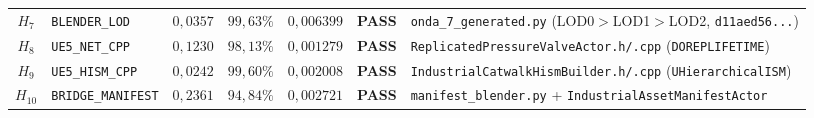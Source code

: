 \documentclass[10pt,a4paper]{article}
\begin{document}
\begin{table}[!htbp]
\begin{tabularx}{\linewidth}{@{}clrrrrY@{}}
$H_7$ & \texttt{BLENDER\_\allowbreak{}LOD} & $0,0357$ & $99,63\%$ & $0,006399$ & \textbf{PASS} & \texttt{onda\_\allowbreak{}7\_\allowbreak{}generated.py} (LOD0$>$LOD1$>$LOD2, \texttt{d11aed56...}) \\
$H_8$ & \texttt{UE5\_\allowbreak{}NET\_\allowbreak{}CPP} & $0,1230$ & $98,13\%$ & $0,001279$ & \textbf{PASS} & \texttt{ReplicatedPressureValveActor.h/.cpp} (\texttt{DOREPLIFETIME}) \\
$H_9$ & \texttt{UE5\_\allowbreak{}HISM\_\allowbreak{}CPP} & $0,0242$ & $99,60\%$ & $0,002008$ & \textbf{PASS} & \texttt{IndustrialCatwalkHismBuilder.h/.cpp} (\texttt{UHierarchicalISM}) \\
$H_{10}$ & \texttt{BRIDGE\_\allowbreak{}MANIFEST} & $0,2361$ & $94,84\%$ & $0,002721$ & \textbf{PASS} & \texttt{manifest\_\allowbreak{}blender.py} + \texttt{IndustrialAssetManifestActor} \\
\bottomrule
\end{tabularx}


\end{table}
\end{document}

